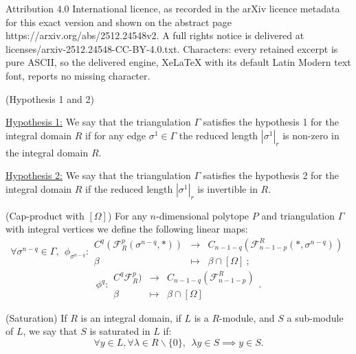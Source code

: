 \documentclass[10pt,a4paper]{amsart}
\begin{document}
Attribution 4.0 International licence, as recorded in the arXiv licence metadata for this exact version and shown on the abstract page https://arxiv.org/abs/2512.24548v2. A full rights notice is delivered at licenses/arxiv-2512.24548-CC-BY-4.0.txt. Characters: every retained excerpt is pure ASCII, so the delivered engine, XeLaTeX with its default Latin Modern text font, reports no missing character.
\begin{definition}
    (Hypothesis 1 and 2)
    
    \underline{Hypothesis 1:} We say that the triangulation $\Gamma$ satisfies the hypothesis 1 for the integral domain $R$ if for any edge $\sigma^1 \in \Gamma$ the reduced length $|\sigma^1|_r$ is non-zero in the integral domain $R$.
    
    \underline{Hypothesis 2:} We say that the triangulation $\Gamma$ satisfies the hypothesis 2 for the integral domain $R$ if the reduced length $|\sigma^1|_r$ is invertible in $R$.
    \label{max}
\end{definition}

\begin{definition}
    (Cap-product with $[\Omega]$) For any $n$-dimensional polytope $P$ and triangulation $\Gamma$ with integral vertices we define the following linear maps:
    \begin{equation*}
        \forall \sigma^{n-q}\in \Gamma,~~ \phi_{\sigma^{n-q}}: \begin{array}{rcl}
             C^{q}(\mathcal{F}^{p}_R(\sigma^{n-q},*)) & \rightarrow & C_{n-1-q}(\mathcal{F}_{n-1-p}^R(*,\sigma^{n-q}))  \\
             \beta & \mapsto & \beta \cap [\Omega] ~;
        \end{array}
    \end{equation*}
    \begin{equation*}
        \phi^q: \begin{array}{rcl}
             C^{q}\mathcal{F}^{p}_R) & \rightarrow & C_{n-1-q}(\mathcal{F}_{n-1-p}^R)  \\
             \beta & \mapsto & \beta \cap [\Omega] 
        \end{array}.
    \end{equation*}
    \label{defphi}
\end{definition}

\begin{definition}
    (Saturation) If $R$ is an integral domain, if $L$ is a $R$-module, and $S$ a sub-module of $L$, we say that $S$ is saturated in $L$ if:
    \begin{equation*}
        \forall y\in L, \forall \lambda\in R \backslash\{0\},~~\lambda y \in S \implies y \in S.
    \end{equation*}
    \label{sat}
\end{definition}
\end{document}
